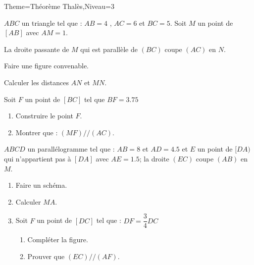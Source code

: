 \documentclass[a4paper,12pt]{article}
\begin{document}
\begin{Maquette}[Fiche]{Theme=Théorème Thalès,Niveau=3}

\begin{exercice}
$ABC$ un triangle tel que : $AB=4$ , $AC=6$ et $BC=5$. Soit $M$ un point de $[AB]$ avec $AM=1$.

La droite passante de $M$ qui est parallèle de $(BC)$ coupe $(AC)$ en $N$.
\begin{enumerate}
\begin{minipage}{.5\linewidth}
\item Faire une figure convenable.
\item Calculer les distances $AN$ et $MN$.
\end{minipage}%
\begin{minipage}{.5\linewidth}
\item Soit $F$ un point de $[BC]$ tel que $BF=3.75$
\begin{enumerate}
\item Construire le point $F$.
\item Montrer que : $(MF)//(AC)$.
\end{enumerate}
\end{minipage}
\end{enumerate}
\end{exercice}

\begin{exercice}
$ABCD$ un parallélogramme tel que : $AB=8$ et $AD=4.5$ et $E$ un point de $[DA)$ qui n'appartient pas à $[DA]$ avec $AE=1.5$; la droite $(EC)$ coupe $(AB)$ en $M$.
\begin{enumerate}
\item Faire un schéma.
\item Calculer $MA$.
\item Soit $F$ un point de $[DC]$ tel que : $DF=\dfrac{3}{4}DC$
\begin{enumerate}
\item Compléter la figure.
\item Prouver que $(EC)//(AF)$.
\end{enumerate}
\end{enumerate}
\end{exercice}


\end{Maquette}
\end{document}
